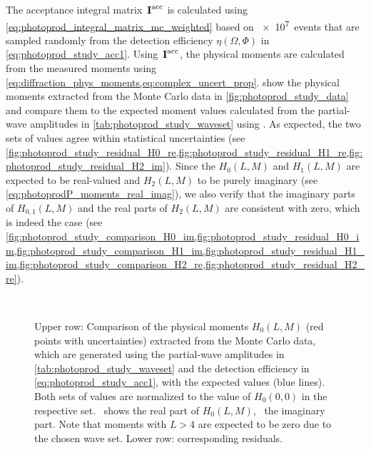 The acceptance integral matrix~$\bm{\mathrm{I}}^\text{acc}$ is calculated
using \cref{eq:photoprod_integral_matrix_mc_weighted} based on \num{e7}~events
that are sampled randomly from the detection efficiency $\eta(\Omega,
\Phi)$ in \cref{eq:photoprod_study_acc1}.  Using~$\bm{\mathrm{I}}^\text{acc}$,
the physical moments are calculated from the measured moments using
\cref{eq:diffraction_phys_moments,eq:complex_uncert_prop}.
show the physical moments extracted from the Monte Carlo data in
\cref{fig:photoprod_study_data} and compare them to the expected
moment values calculated from the partial-wave amplitudes in
\cref{tab:photoprod_study_waveset} using
.
As expected, the two sets of values  agree within statistical
uncertainties (see
\cref{fig:photoprod_study_residual_H0_re,fig:photoprod_study_residual_H1_re,fig:photoprod_study_residual_H2_im}).
Since the $H_0(L, M)$ and $H_1(L, M)$ are expected to be real-valued
and $H_2(L, M)$ to be purely imaginary (see
\cref{eq:photoprodP_moments_real_imag}), we also verify that the
imaginary parts of $H_{0, 1}(L, M)$ and the real parts of $H_2(L, M)$
are consistent with zero, which is indeed the case (see
\cref{fig:photoprod_study_comparison_H0_im,fig:photoprod_study_residual_H0_im,fig:photoprod_study_comparison_H1_im,fig:photoprod_study_residual_H1_im,fig:photoprod_study_comparison_H2_re,fig:photoprod_study_residual_H2_re}).

\begin{figure}[tbp]
  \centering%
  \\%
  \caption{Upper row: Comparison of the physical moments $H_0(L, M)$
  (red points with uncertainties) extracted from the Monte Carlo data,
  which are generated using the partial-wave amplitudes in
  \cref{tab:photoprod_study_waveset} and the detection efficiency in
  \cref{eq:photoprod_study_acc1}, with the expected values (blue
  lines).  Both sets of values are normalized to the value of $H_0(0,
  0)$ in the respective set.
  ~shows the real
  part of $H_0(L, M)$,
  ~the imaginary
  part.  Note that moments with $L > 4$ are expected to be zero due to
  the chosen wave set.  Lower row: corresponding residuals.}%
  \label{fig:photoprod_study_output_H0}%
\end{figure}

